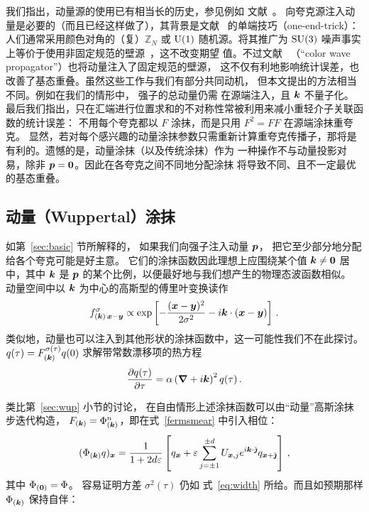 我们指出，动量源的使用已有相当长的历史，参见例如
文献~\cite{Gockeler:1998ye,Brown:2012tm,Bali:2015msa}。
向夸克源注入动量是必要的（而且已经这样做了），其背景是文献~\cite{Sommer:1994gg,Foster:1998wu}
的单端技巧（one-end-trick）：
人们通常采用颜色对角的（复）$\mathbb{Z}_N$ 或
$\textmd{U}(1)$ 随机源。将其推广为
$\textmd{SU}(3)$ 噪声事实上等价于使用非固定规范的壁源~\cite{Billoire:1985yn}，这不改变期望
值。不过文献~\cite{Detmold:2012wc,Basak:2012py}
（``color wave propagator''）也将动量注入了固定规范的壁源，
这不仅有利地影响统计误差，也改善了基态重叠。虽然这些工作与我们有部分共同动机，
但本文提出的方法相当不同。例如在我们的情形中，
强子的总动量仍需
在源端注入，且 $\boldsymbol{k}$ 不量子化。\\

最后我们指出，只在汇端进行位置求和的不对称性常被利用来减小重轻介子关联函数的统计误差：
不用每个夸克都以 $F$ 涂抹，而是只用
$F^2=FF$ 在源端涂抹重夸克。
显然，若对每个感兴趣的动量涂抹参数只需重新计算重夸克传播子，那将是有利的。遗憾的是，动量涂抹（以及传统涂抹）作为
一种操作不与动量投影对易，除非
$\boldsymbol{p}=\boldsymbol{0}$。因此在各夸克之间不同地分配涂抹
将导致不同、且不一定最优的基态重叠。

\subsection{动量（Wuppertal）涂抹}
\label{sec:newsmear}
如第~\ref{sec:basic} 节所解释的，
如果我们向强子注入动量 $\boldsymbol{p}$，
把它至少部分地分配给各个夸克可能是好主意。
它们的涂抹函数因此理想上应围绕某个值 $\boldsymbol{k}\neq\boldsymbol{0}$ 居中，其中 $\boldsymbol{k}$ 是
$\boldsymbol{p}$ 的某个比例，以便最好地与我们想产生的物理态波函数相似。\\

动量空间中以 $\boldsymbol{k}$ 为中心的高斯型的傅里叶变换读作
\begin{equation}
f^{\sigma}_{(\boldsymbol{k})\,\boldsymbol{x}-\boldsymbol{y}}\propto
\exp\left[-\frac{(\boldsymbol{x}-\boldsymbol{y})^2}{2\sigma^2}-i\boldsymbol{k}\cdot(\boldsymbol{x}-\boldsymbol{y})\right]\,.\label{eq:momsf}
\end{equation}
类似地，动量也可以注入到其他形状的涂抹函数中，这一可能性我们不在此探讨。
$q(\tau)=F_{(\boldsymbol{k})}^{\sigma(\tau)}q(0)$
求解带常数漂移项的热方程
\begin{equation}
\label{eq:drift}
\frac{\partial q(\tau)}{\partial\tau}=
\alpha\left(\boldsymbol{\nabla}+i\boldsymbol{k}\right)^2 q(\tau)\,.
\end{equation}

类比第~\ref{sec:wup} 小节的讨论，
在自由情形上述涂抹函数可以由``动量''高斯涂抹步迭代构造，
$F_{(\boldsymbol{k})} =\Phi_{(\boldsymbol{k})}^n$，即在式~\eqref{fermsmear} 中引入相位：
\begin{equation}
(\Phi_{(\boldsymbol{k})} q)_{\boldsymbol{x}} = \frac{1}{1+2d\varepsilon} \left[q_{\boldsymbol{x}}+\varepsilon \sum_{j=\pm 1}^{\pm d} U_{\boldsymbol{x},j}e^{i\boldsymbol{k}\cdot\hat{\boldsymbol{\jmath}}} q_{\boldsymbol{x}+\hat{\boldsymbol{\jmath}}}\right]\,, \label{fermsmear2}
\end{equation}
其中 $\Phi_{(\boldsymbol{0})}=\Phi$。
容易证明方差 $\sigma^2(\tau)$ 仍如
式~\eqref{eq:width} 所给。而且如预期那样
$\Phi_{(\boldsymbol{k})}$ 保持自伴：

